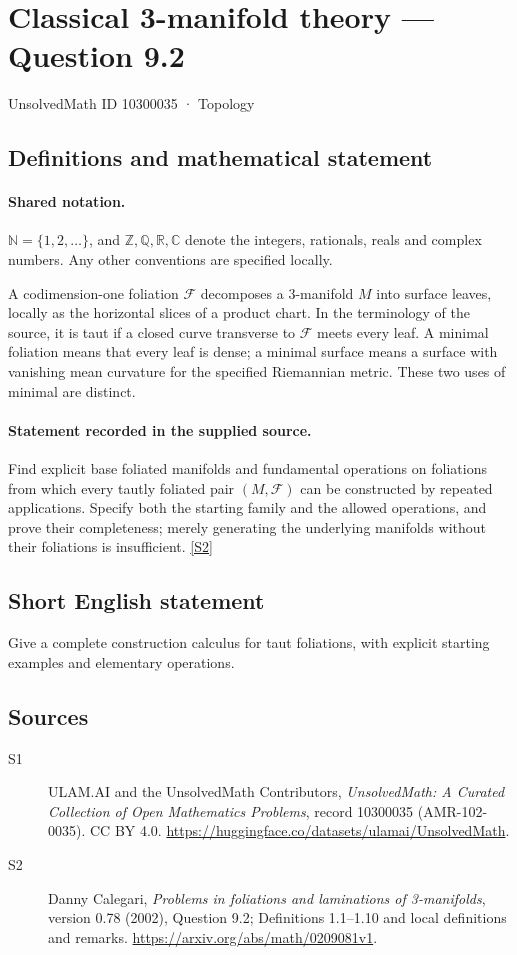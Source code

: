 \documentclass[11pt]{article}
\newcommand{\sref}[2]{\hyperlink{source:#1:#2}{[S#2]}}
\begin{document}
\setcounter{section}{10300034}
\section{Classical 3-manifold theory — Question 9.2}\label{10300035}
{\small\sffamily UnsolvedMath ID 10300035 · Topology}
\subsection{Definitions and mathematical statement}

\paragraph{Shared notation.}$\mathbb N=\{1,2,\ldots\}$, and $\mathbb Z,\mathbb Q,\mathbb R,\mathbb C$ denote the integers, rationals, reals and complex numbers. Any other conventions are specified locally.


A codimension-one foliation $\mathcal F$ decomposes a $3$-manifold $M$ into surface leaves, locally as the horizontal slices of a product chart. In the terminology of the source, it is taut if a closed curve transverse to $\mathcal F$ meets every leaf. A minimal foliation means that every leaf is dense; a minimal surface means a surface with vanishing mean curvature for the specified Riemannian metric. These two uses of minimal are distinct.
\paragraph{Statement recorded in the supplied source.}
Find explicit base foliated manifolds and fundamental operations on foliations from which every tautly foliated pair $(M,\mathcal F)$ can be constructed by repeated applications. Specify both the starting family and the allowed operations, and prove their completeness; merely generating the underlying manifolds without their foliations is insufficient. \sref{10300035}{2}
\subsection{Short English statement}
Give a complete construction calculus for taut foliations, with explicit starting examples and elementary operations.
\subsection{Sources}
\begin{description}
\item[\hypertarget{source:10300035:1}{S1}] ULAM.AI and the UnsolvedMath Contributors, \emph{UnsolvedMath: A Curated Collection of Open Mathematics Problems}, record 10300035 (AMR-102-0035). CC BY 4.0. \url{https://huggingface.co/datasets/ulamai/UnsolvedMath}.
\item[\hypertarget{source:10300035:2}{S2}] Danny Calegari, \emph{Problems in foliations and laminations of 3-manifolds}, version 0.78 (2002), Question 9.2; Definitions 1.1--1.10 and local definitions and remarks. \url{https://arxiv.org/abs/math/0209081v1}.
\end{description}
\label{end:10300035}
\end{document}
